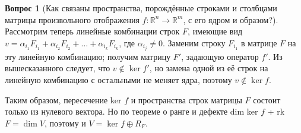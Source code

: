 \documentclass[a4paper,11pt]{article}
\theoremstyle{remark}
\theoremstyle{definition}
\newtheorem{question}{Вопрос}
\numberwithin{question}{subsection}
\begin{document}
\begin{question}[Как связаны пространства, порождённые строками и столбцами матрицы произвольного отображения \(f: \mathbb{R}^n \rightarrow \mathbb{R}^m\), с его ядром и образом?]
Рассмотрим теперь линейные комбинации строк \(F\), имеющие вид \(v = \alpha_{i_1} F_{i_1} + \alpha_{i_2} F_{i_2} + \dots + \alpha_{i_k} F_{i_k}\), где \(\alpha_{i_j} \neq 0\). Заменим строку \(F_{i_1}\) в матрице \(F\) на эту линейную комбинацию; получим матрицу \(F'\), задающую оператор \(f'\). Из вышесказанного следует, что \(v \notin \ker f'\), но замена одной из её строк на линейную комбинацию с остальными не меняет ядра, поэтому \(v \notin \ker f\).

Таким образом, пересечение ker \(f\) и пространства строк матрицы \(F\) состоит только из нулевого вектора. Но по теореме о ранге и дефекте dim ker \(f\) + rk \(F = \dim V\), поэтому и \(V = \ker f \oplus R_F\). 
\end{question}
\end{document}
